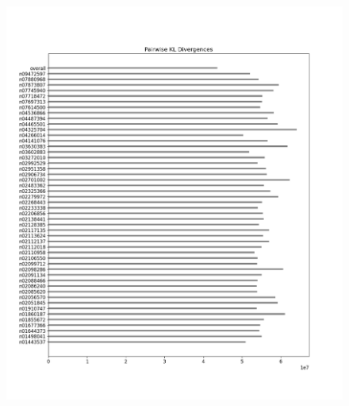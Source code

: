 \documentclass{article}
\begin{document}
\begin{figure}[H]
\begin{minipage}{0.45\textwidth}
            \includegraphics[width=\textwidth]{cross_imagenet_imgr_r_second_last_untrained/alexnet_kl_div_b_to_apairwise.png} %
            

\end{minipage}
\end{figure}
\end{document}
